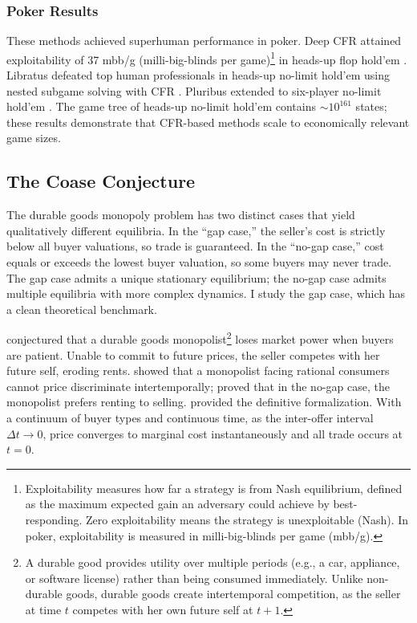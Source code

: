 \subsubsection{Poker Results}

These methods achieved superhuman performance in poker. Deep CFR attained exploitability of 37 mbb/g (milli-big-blinds per game)\footnote{Exploitability measures how far a strategy is from Nash equilibrium, defined as the maximum expected gain an adversary could achieve by best-responding. Zero exploitability means the strategy is unexploitable (Nash). In poker, exploitability is measured in milli-big-blinds per game (mbb/g).} in heads-up flop hold'em \citep{Brown2019}. Libratus defeated top human professionals in heads-up no-limit hold'em using nested subgame solving with CFR \citep{brown2017superhuman}. Pluribus extended to six-player no-limit hold'em \citep{brown2019superhuman}. The game tree of heads-up no-limit hold'em contains $\sim 10^{161}$ states; these results demonstrate that CFR-based methods scale to economically relevant game sizes.

\subsection{The Coase Conjecture}

The durable goods monopoly problem has two distinct cases that yield qualitatively different equilibria. In the ``gap case,'' the seller's cost is strictly below all buyer valuations, so trade is guaranteed. In the ``no-gap case,'' cost equals or exceeds the lowest buyer valuation, so some buyers may never trade. The gap case admits a unique stationary equilibrium; the no-gap case admits multiple equilibria with more complex dynamics. I study the gap case, which has a clean theoretical benchmark.

\citet{coase1972durability} conjectured that a durable goods monopolist\footnote{A durable good provides utility over multiple periods (e.g., a car, appliance, or software license) rather than being consumed immediately. Unlike non-durable goods, durable goods create intertemporal competition, as the seller at time $t$ competes with her own future self at $t+1$.} loses market power when buyers are patient. Unable to commit to future prices, the seller competes with her future self, eroding rents. \citet{stokey1981rational} showed that a monopolist facing rational consumers cannot price discriminate intertemporally; \citet{bulow1982durable} proved that in the no-gap case, the monopolist prefers renting to selling. \citet{gul1986foundations} provided the definitive formalization. With a continuum of buyer types and continuous time, as the inter-offer interval $\Delta t \to 0$, price converges to marginal cost instantaneously and all trade occurs at $t = 0$.


